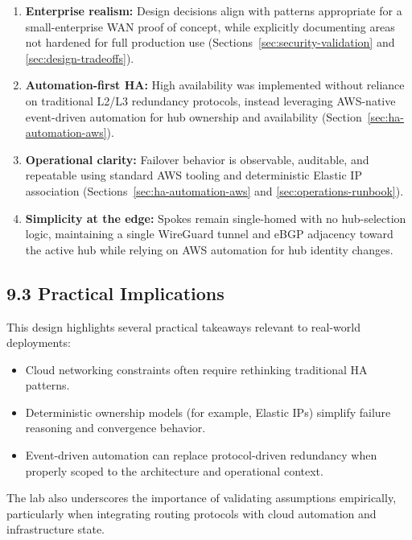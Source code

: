 \documentclass[11pt]{article}
\begin{document}
\begin{enumerate}
  \item \textbf{Enterprise realism:}  
  Design decisions align with patterns appropriate for a small-enterprise WAN proof of concept, while explicitly documenting areas not hardened for full production use (Sections~\ref{sec:security-validation} and \ref{sec:design-tradeoffs}).

  \item \textbf{Automation-first HA:}  
  High availability was implemented without reliance on traditional L2/L3 redundancy protocols, instead leveraging AWS-native event-driven automation for hub ownership and availability (Section~\ref{sec:ha-automation-aws}).

  \item \textbf{Operational clarity:}  
  Failover behavior is observable, auditable, and repeatable using standard AWS tooling and deterministic Elastic IP association (Sections~\ref{sec:ha-automation-aws} and \ref{sec:operations-runbook}).

  \item \textbf{Simplicity at the edge:}  
  Spokes remain single-homed with no hub-selection logic, maintaining a single WireGuard tunnel and eBGP adjacency toward the active hub while relying on AWS automation for hub identity changes.
\end{enumerate}

\subsection{9.3 Practical Implications}
\label{sec:conclusion-implications}

This design highlights several practical takeaways relevant to real-world deployments:

\begin{itemize}
  \item Cloud networking constraints often require rethinking traditional HA patterns.
  \item Deterministic ownership models (for example, Elastic IPs) simplify failure reasoning and convergence behavior.
  \item Event-driven automation can replace protocol-driven redundancy when properly scoped to the architecture and operational context.
\end{itemize}

The lab also underscores the importance of validating assumptions empirically, particularly when integrating routing protocols with cloud automation and infrastructure state.
\end{document}
